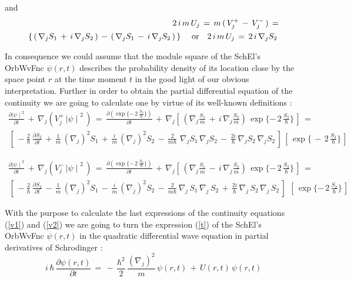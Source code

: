\documentclass[12pt]{article}
\begin{document}
and
\begin{eqnarray}\label{us2}
2\,i\,m\,U_j\,=\,m\,(\,V_j^+\,-\,V_j^-\,)\,=  \nonumber  \\
\,\left\{\,(\,\nabla _j S_1\,+\,i\,\nabla _j S_2\,)\,-
\,(\,\nabla _j S_1\,-\,i\,\nabla _j S_2\,)\,\right\}\,
\quad {\rm or} \quad 2\,i\,m\,U_j\,=\,2\,i\,\nabla _j S_2\,
\end{eqnarray}

 In consequence we could assume that the module square of the SchEl's OrbWvFnc
$\psi(r,t)$ describes the probability density of its location close by the
space point $r$ at the time moment $t$ in the good light of our obvious
interpretation.  Further in order to obtain the partial differential equation
of the continuity we are going to calculate one by virtue of its well-known
definitions :
\begin{eqnarray}\label{v1}
\frac{\partial {\mid\psi\mid}^2}{\partial t}\,+
\,\nabla _j (V_j^{+}\,{\mid\psi\mid}^2\,)\,=
\,\frac{\partial (\exp{\{-\,2\,\frac {S_2}{\hbar }\}})}{\partial t}\,+
\,\nabla _j \left[\,(\nabla _j \frac{S_1}{m}\,+\,i\,\nabla _j \frac{S_2}{m})\,
\exp{\{-\,2\,\frac{S_2}{\hbar}\}}\,\right]\,=  \nonumber  \\
\,\left[\,-\frac{2}{\hbar}\,\frac{\partial {S_2}}{\partial t}\,+
\,\frac{1}{m}\,(\nabla _j)^2 {S_1}\,+
\,\frac{i}{m}\,(\nabla _j)^2 {S_2}\,-
\,\frac{2}{m\hbar}\,\,\nabla _j {S_1}\,\nabla _j {S_2}\,-
\,\frac{2i}{\hbar}\,\nabla _j {S_2}\,\nabla _j {S_2}\,\right]\,
\left [\,\exp{\{\,-\,2\,\frac{S_2}{\hbar}\}}\,\right ]
\end{eqnarray}

\begin{eqnarray}\label{v2}
\frac{\partial {\mid\psi\mid}^2}{\partial t}\,+
\,\nabla _j (V_j^{-}\,{\mid\psi\mid}^2\,)\,=
\,\frac{\partial (\exp{\{-\,2\,\frac{S_2}{\hbar}\}})}{\partial t}\,+
\,\nabla _j \left[\,(\nabla _j \frac{S_1}{m}\,-\,i\,\nabla _j \frac{S_2}{m})\,
\exp{\{-\,2\,\frac{S_2}{\hbar}\}}\,\right]\,=  \nonumber  \\
\,\left[\,-\frac{2}{\hbar}\,\frac{\partial {S_2}}{\partial t}\,-
\,\frac{1}{m}\,(\nabla _j)^2 {S_1}\,-
\,\frac{i}{m}\,(\nabla _j)^2 {S_2}\,-
\,\frac{2}{m\hbar}\,\nabla _j\,{S_1}\,\nabla _j\,{S_2}\,+
\,\frac{2i}{\hbar}\,\nabla _j\,{S_2}\,\nabla _j\,{S_2}\,\right]\
\,\left[\,\exp{\{-\,2\,\frac{S_2}{\hbar }\}}\,\right]
\end{eqnarray}

 With the purpose to calculate the last expressions of the continuity
equations (\ref{v1}) and (\ref{v2}) we are going to turn the expression
(\ref{t}) of the SchEl's OrbWvFnc $\psi(r,t)$ in the quadratic
differential wave equation in partial derivatives of Schrodinger :
\begin{equation}\label{w}
\,i\,\hbar\,\frac{\partial \psi(r,t)}{\partial t}\,=
\,-\,\frac{\hbar^2}{2}\,\frac{(\nabla_j)^2}{m}\,\psi(r,t)\,+\,U(r,t)\,\psi(r,t)
\end{equation}
\end{document}
